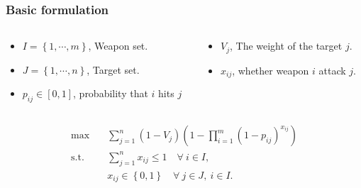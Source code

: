 \documentclass[CJK,10pt]{beamer}
\begin{document}
\begin{frame}
    \frametitle{Basic formulation}
    \begin{columns}
        \begin{column}{.50\linewidth}
            \footnotesize
            \begin{itemize}
                \item $I = \left\{1,\cdots,m\right\} $, Weapon set.
                \item $J = \left\{1,\cdots,n\right\} $, Target set.
                \item $p_{ij}\in [0,1]$, probability that $i$ hits $j$
            \end{itemize}
        \end{column}
    \hspace{-1cm}
        \begin{column}{.50\linewidth}
            \footnotesize
            \begin{itemize}
                \item $V_j$, The weight of the target $j$.
                \item $x_{ij}$, whether weapon $i$ attack $j$.
            \end{itemize}
        \end{column}
    \end{columns}
    
    \begin{align*} \tag{S0}
        \max\quad & \sum_{j=1}^n (1 - V_j) \left( 1 - \prod_{i=1}^m (1 -  p_{ij})^{x_{ij}} \right) \\ 
        \mathrm{s. t.}\quad &\sum_{j=1}^n x_{ij} \leq 1\quad \forall ~i \in I,\\
        & x_{ij} \in \left\{ 0,1 \right\} \quad \forall~ j\in J , ~ i \in I.
    \end{align*}
\end{frame}
\end{document}

